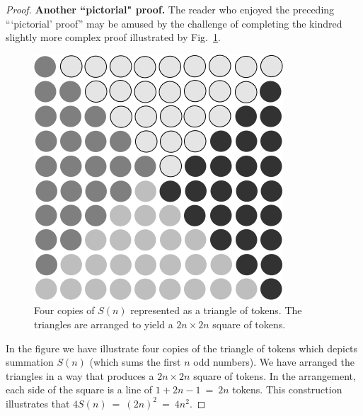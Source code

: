 \begin{proof}
{\bf Another ``pictorial" proof.}
The reader who enjoyed the preceding ```pictorial' proof'' may be amused by the challenge of completing the kindred slightly more complex proof illustrated by Fig.~\ref{fig:anotherSumOdds}.
\begin{figure}[htb]
\begin{center}
       \includegraphics[scale=0.35]{FiguresMaths/Deltaodd}
\caption{Four copies of $S(n)$ represented as a triangle of tokens.  The triangles are arranged to yield a $2n \times 2n$ square of tokens.}
       \label{fig:anotherSumOdds}
\end{center}
\end{figure}
In the figure we have illustrate four copies of the triangle of tokens which depicts summation $S(n)$ (which sums the first $n$ odd numbers).  We have arranged the triangles in a way that produces a $2n \times 2n$ square of tokens.  In the arrangement, each side of the square is a line of $1+2n-1 \ = \ 2n$ tokens.  This construction illustrates that $4 S(n) \ = \ (2n)^2  \ = \ 4n^2$.
\end{proof}

\medskip

